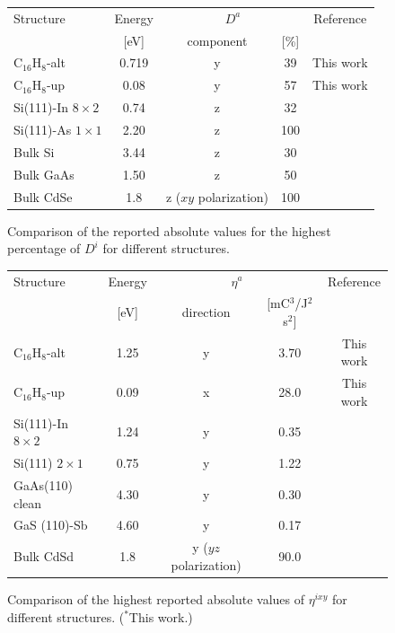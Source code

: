\documentclass[pss]{wiley2sp} %
\begin{document}
\begin{figure}[htb]%
  \sidecaption
  \begin{tabular}{lcccc}
  \hline
  Structure & Energy &  \multicolumn{2}{c}{$D^{a}$} &  Reference\\
  \cline{3-4}
  & [eV]   & component & [\%] \\
  \hline
  C$_{16}$H$_{8}$-alt  & 0.719& y & 39     & This work \\
  C$_{16}$H$_{8}$-up   & 0.08 & y & 57     & This work \\
  Si(111)-In $8\times2$& 0.74 & z & 32     & \cite{arzate2014optical}  \\
  Si(111)-As $1\times1$& 2.20 & z & 100    & \cite{mendoza2012optical} \\
  Bulk Si              & 3.44 & z & 30     & \cite{nastos2007full}     \\
  Bulk GaAs            & 1.50 & z & 50     & \cite{nastos2007full,bhat2005excitonic} \\
  Bulk CdSe            & 1.8  & z ($xy$ polarization) & 100& \cite{nastos2007full}\\
  \hline
  \end{tabular}
  \caption[]{%
  Comparison of the reported absolute values for the highest 
  percentage of {$D^{i}$} for different structures.}
  \label{tab:dacomp}
\end{figure}


\begin{figure}[htb]%
  \sidecaption
  \begin{tabular}{lcccc}
  \hline
    Structure & Energy &  \multicolumn{2}{c}{$\eta^{a}$} &  Reference\\
    \cline{3-4}
              & [eV]   & direction & [mC$^{3}$/J$^{2}$s$^{2}$] \\
    \hline
    C$_{16}$H$_{8}$-alt     & 1.25  & y & 3.70  & This work     \\
    C$_{16}$H$_{8}$-up      & 0.09  & x & 28.0  & This work     \\
    Si(111)-In $8\times2$   & 1.24  & y & 0.35  & \cite{arzate2014optical}  \\
    Si(111) $2\times1$      & 0.75  & y & 1.22  & \cite{mendoza2012optical} \\
    GaAs(110) clean         & 4.30  & y & 0.30  & \cite{nastos2007full}     \\
    GaS (110)-Sb            & 4.60  & y & 0.17  & \cite{cabellos2011optical}\\
    Bulk CdSd               & 1.8   & y ($yz$ polarization) 
    & 90.0  & \cite{nastos2006optical}  \\
  \hline
  \end{tabular}
  \caption[]{%
  Comparison of the highest reported absolute values of {$\eta^{ixy}$} for 
    different structures. ($^{*}$This work.)}
  \label{tab:etacomp}
\end{figure}
\end{document}
